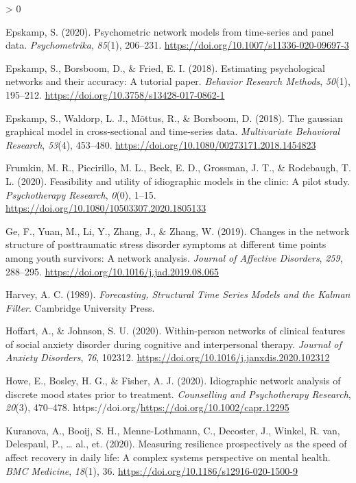 \documentclass[
  english,
  man]{apa6}
\newlength{\cslhangindent}
\newenvironment{CSLReferences}[2] %
 {%
  \setlength{\parindent}{0pt}
  \ifodd #1 \everypar{\setlength{\hangindent}{\cslhangindent}}\ignorespaces\fi
  \ifnum #2 > 0
  \setlength{\parskip}{#2\baselineskip}
  \fi
 }%
 {}
\begin{document}
\begin{CSLReferences}{1}{0}
\leavevmode\hypertarget{ref-Epskamp2020}{}%
Epskamp, S. (2020). Psychometric network models from time-series and panel data. \emph{Psychometrika}, \emph{85}(1), 206--231. \url{https://doi.org/10.1007/s11336-020-09697-3}

\leavevmode\hypertarget{ref-EpskampEtAl2018}{}%
Epskamp, S., Borsboom, D., \& Fried, E. I. (2018). Estimating psychological networks and their accuracy: A tutorial paper. \emph{Behavior Research Methods}, \emph{50}(1), 195--212. \url{https://doi.org/10.3758/s13428-017-0862-1}

\leavevmode\hypertarget{ref-EpskampEtAl2018b}{}%
Epskamp, S., Waldorp, L. J., Mõttus, R., \& Borsboom, D. (2018). The gaussian graphical model in cross-sectional and time-series data. \emph{Multivariate Behavioral Research}, \emph{53}(4), 453--480. \url{https://doi.org/10.1080/00273171.2018.1454823}

\leavevmode\hypertarget{ref-FrumkinEtAl2020}{}%
Frumkin, M. R., Piccirillo, M. L., Beck, E. D., Grossman, J. T., \& Rodebaugh, T. L. (2020). Feasibility and utility of idiographic models in the clinic: A pilot study. \emph{Psychotherapy Research}, \emph{0}(0), 1--15. \url{https://doi.org/10.1080/10503307.2020.1805133}

\leavevmode\hypertarget{ref-GeEtAl2019}{}%
Ge, F., Yuan, M., Li, Y., Zhang, J., \& Zhang, W. (2019). Changes in the network structure of posttraumatic stress disorder symptoms at different time points among youth survivors: A network analysis. \emph{Journal of Affective Disorders}, \emph{259}, 288--295. \url{https://doi.org/10.1016/j.jad.2019.08.065}

\leavevmode\hypertarget{ref-Harvey1989}{}%
Harvey, A. C. (1989). \emph{Forecasting, Structural Time Series Models and the Kalman Filter}. Cambridge University Press.

\leavevmode\hypertarget{ref-HoffartJohnson2020}{}%
Hoffart, A., \& Johnson, S. U. (2020). Within-person networks of clinical features of social anxiety disorder during cognitive and interpersonal therapy. \emph{Journal of Anxiety Disorders}, \emph{76}, 102312. \url{https://doi.org/10.1016/j.janxdis.2020.102312}

\leavevmode\hypertarget{ref-HoweEtAl2020}{}%
Howe, E., Bosley, H. G., \& Fisher, A. J. (2020). Idiographic network analysis of discrete mood states prior to treatment. \emph{Counselling and Psychotherapy Research}, \emph{20}(3), 470--478. https://doi.org/\url{https://doi.org/10.1002/capr.12295}

\leavevmode\hypertarget{ref-KuranovaEtAl2020}{}%
Kuranova, A., Booij, S. H., Menne-Lothmann, C., Decoster, J., Winkel, R. van, Delespaul, P., \ldots{} al., et. (2020). Measuring resilience prospectively as the speed of affect recovery in daily life: A complex systems perspective on mental health. \emph{BMC Medicine}, \emph{18}(1), 36. \url{https://doi.org/10.1186/s12916-020-1500-9}


\end{CSLReferences}
\end{document}
